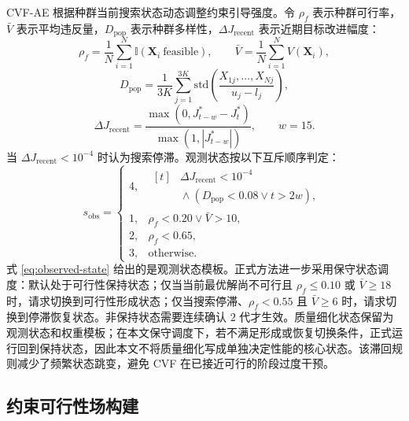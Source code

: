 CVF-AE 根据种群当前搜索状态动态调整约束引导强度。令 $\rho_f$ 表示种群可行率，$\bar{V}$ 表示平均违反量，$D_{\mathrm{pop}}$ 表示种群多样性，$\Delta J_{\mathrm{recent}}$ 表示近期目标改进幅度：
\begin{equation}
    \rho_f=\frac{1}{N}\sum_{i=1}^{N}\mathbb I(\mathbf X_i\ \mathrm{feasible}),
    \qquad
    \bar V=\frac{1}{N}\sum_{i=1}^{N}V(\mathbf X_i),
    \label{eq:state-feasibility}
\end{equation}
\begin{equation}
    D_{\mathrm{pop}}=
    \frac{1}{3K}\sum_{j=1}^{3K}
    \mathrm{std}\left(\frac{X_{1j},\ldots,X_{Nj}}{u_j-l_j}\right),
    \label{eq:state-diversity}
\end{equation}
\begin{equation}
    \Delta J_{\mathrm{recent}}=
    \frac{\max(0,J^*_{t-w}-J^*_{t})}{\max(1,|J^*_{t-w}|)} ,
    \qquad w=15 .
    \label{eq:recent-improvement}
\end{equation}
当 $\Delta J_{\mathrm{recent}}<10^{-4}$ 时认为搜索停滞。观测状态按以下互斥顺序判定：
\begin{equation}
s_{\mathrm{obs}}=
\begin{cases}
4, & \begin{aligned}[t]
        &\Delta J_{\mathrm{recent}}<10^{-4}\\[-1mm]
        &{}\land (D_{\mathrm{pop}}<0.08\lor t>2w),
    \end{aligned}\\
1, & \rho_f<0.20\lor \bar V>10,\\
2, & \rho_f<0.65,\\
3, & \mathrm{otherwise}.
\end{cases}
\label{eq:observed-state}
\end{equation}
式 \eqref{eq:observed-state} 给出的是观测状态模板。正式方法进一步采用保守状态调度：默认处于可行性保持状态；仅当当前最优解尚不可行且 $\rho_f\leq0.10$ 或 $\bar V\geq18$ 时，请求切换到可行性形成状态；仅当搜索停滞、$\rho_f<0.55$ 且 $\bar V\geq6$ 时，请求切换到停滞恢复状态。非保持状态需要连续确认 $2$ 代才生效。质量细化状态保留为观测状态和权重模板；在本文保守调度下，若不满足形成或恢复切换条件，正式运行回到保持状态，因此本文不将质量细化写成单独决定性能的核心状态。该滞回规则减少了频繁状态跳变，避免 CVF 在已接近可行的阶段过度干预。

\subsection{约束可行性场构建}

